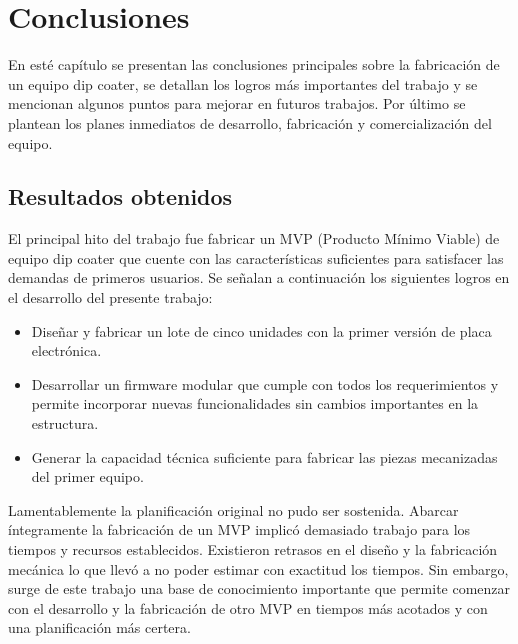 
\chapter{Conclusiones} %

\label{Chapter5} %



En esté capítulo se presentan las conclusiones principales sobre la fabricación de un equipo dip coater, se detallan los logros más importantes del trabajo y se mencionan algunos puntos para mejorar en futuros trabajos. Por último se plantean los planes inmediatos de desarrollo, fabricación y comercialización del equipo.

\section{Resultados obtenidos }


El principal hito del trabajo fue fabricar un MVP (Producto Mínimo Viable) de equipo dip coater que cuente con las características suficientes para satisfacer las demandas de primeros usuarios. 
Se señalan a continuación los siguientes logros en el desarrollo del presente trabajo: 
\begin{itemize}
\item Diseñar y fabricar un lote de cinco unidades con la primer versión de placa electrónica.
\item Desarrollar un firmware modular que cumple con todos los requerimientos y permite incorporar nuevas funcionalidades sin cambios importantes en la estructura.
\item Generar la capacidad técnica suficiente para fabricar las piezas mecanizadas del primer equipo.  
\end{itemize} 
 

Lamentablemente la planificación original no pudo ser sostenida. Abarcar íntegramente la fabricación de un MVP implicó demasiado trabajo para los tiempos y recursos establecidos. Existieron retrasos en el diseño y la fabricación mecánica lo que llevó a no poder estimar con exactitud los tiempos. Sin embargo, surge de este trabajo una base de conocimiento importante que permite comenzar con el desarrollo y la fabricación de otro MVP en tiempos más acotados y con una planificación más certera. 


